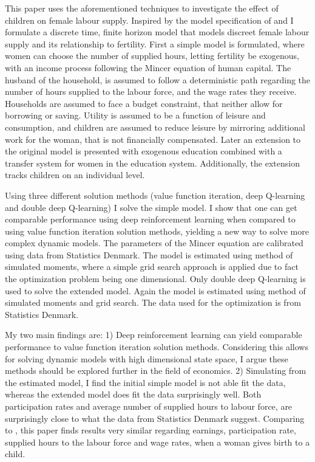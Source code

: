 This paper uses the aforementioned techniques to investigate the effect of children on female labour supply. Inspired by the model specification of \textcite{francesconi_joint_2002} and \textcite{adda_career_2011} I formulate a discrete time, finite horizon model that models discreet female labour supply and its relationship to fertility. First a simple model is formulated, where women can choose the number of supplied hours, letting fertility be exogenous, with an income process following the Mincer equation of human capital. The husband of the household, is assumed to follow a deterministic path regarding the number of hours supplied to the labour force, and the wage rates they receive. Households are assumed to face a budget constraint, that neither allow for borrowing or saving. Utility is assumed to be a function of leisure and consumption, and children are assumed to reduce leisure by mirroring additional work for the woman, that is not financially compensated. Later an extension to the original model is presented with exogenous education combined with a transfer system for women in the education system. Additionally, the extension tracks children on an individual level.

Using three different solution methods (value function iteration, deep Q-learning and double deep Q-learning) I solve the simple model. I show that one can get comparable performance using deep reinforcement learning when compared to using value function iteration solution methods, yielding a new way to solve more complex dynamic models. The parameters of the Mincer equation are calibrated using data from Statistics Denmark. The model is estimated using method of simulated moments, where a simple grid search approach is applied due to fact the optimization problem being one dimensional. Only double deep Q-learning is used to solve the extended model. Again the model is estimated using method of simulated moments and grid search. The data used for the optimization is from Statistics Denmark.

My two main findings are: 1) Deep reinforcement learning can yield comparable performance to value function iteration solution methods. Considering this allows for solving dynamic models with high dimensional state space, I argue these methods should be explored further in the field of economics. 2) Simulating from the estimated model, I find the initial simple model is not able fit the data, whereas the extended model does fit the data surprisingly well. Both participation rates and average number of supplied hours to labour force, are surprisingly close to what the data from Statistics Denmark suggest. Comparing to  \textcite{kleven_children_2019}, this paper finds results very similar regarding earnings, participation rate, supplied hours to the labour force and wage rates, when a woman gives birth to a child.

